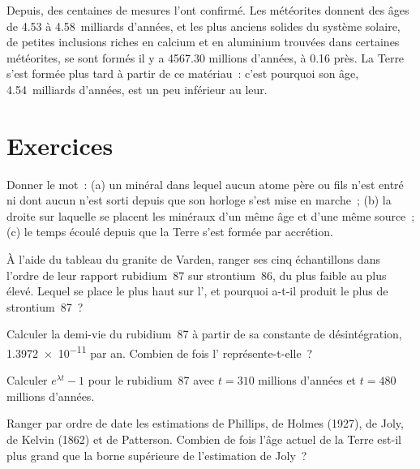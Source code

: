Depuis, des centaines de mesures l'ont confirmé. Les météorites donnent
des âges de 4.53 à 4.58~milliards d'années, et les plus anciens solides du
système solaire, de petites inclusions riches en calcium et en aluminium
trouvées dans certaines météorites, se sont formés il y a \num{4567.30}
millions d'années, à 0.16 près. La Terre s'est formée plus tard à partir
de ce matériau~: c'est pourquoi son âge, 4.54~milliards d'années, est un
peu inférieur au leur.

\section{Exercices}

\begin{exercise}[$\star$]\label{exo:g12:age-of-the-earth:1}
Donner le mot~: (a) un minéral dans lequel aucun atome père ou fils n'est
entré ni dont aucun n'est sorti depuis que son horloge s'est mise en
marche~; (b) la droite sur laquelle se placent les minéraux d'un même âge
et d'une même source~; (c) le temps écoulé depuis que la Terre s'est
formée par accrétion.
\end{exercise}

\begin{exercise}[$\star$]\label{exo:g12:age-of-the-earth:2}
À l'aide du tableau du granite de Varden, ranger ses cinq échantillons
dans l'ordre de leur rapport rubidium~87 sur strontium~86, du plus faible au
plus élevé. Lequel se place le plus haut sur l', et pourquoi
a-t-il produit le plus de strontium~87~?
\end{exercise}

\begin{exercise}[$\star$]\label{exo:g12:age-of-the-earth:3}
Calculer la demi-vie du rubidium~87 à partir de sa constante de
désintégration, \num{1.3972e-11} par an. Combien de fois l'
représente-t-elle~?
\end{exercise}

\begin{exercise}[$\star$]\label{exo:g12:age-of-the-earth:4}
Calculer $e^{\lambda t} - 1$ pour le rubidium~87 avec $t = 310$ millions
d'années et $t = 480$ millions d'années.
\end{exercise}

\begin{exercise}[$\star$]\label{exo:g12:age-of-the-earth:5}
Ranger par ordre de date les estimations de Phillips, de Holmes (1927), de
Joly, de Kelvin (1862) et de Patterson. Combien de fois l'âge actuel de la
Terre est-il plus grand que la borne supérieure de l'estimation de Joly~?
\end{exercise}

